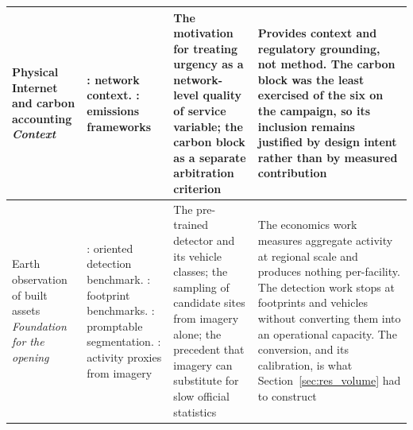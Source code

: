 \begin{longtable}{>{\raggedright\arraybackslash}p{2.6cm} >{\raggedright\arraybackslash}p{3.0cm} >{\raggedright\arraybackslash}p{3.4cm} >{\raggedright\arraybackslash}p{4.4cm}}
Physical Internet and carbon accounting \newline \textit{Context} &
\autocite{montreuil2011toward,guo2020dynamic,li2020exploring}: network context.
\autocite{smartfreight2023glec,commission2017vecto,ademe2014impacts,iso14083}: emissions
frameworks &
The motivation for treating urgency as a network-level quality of service variable; the
carbon block as a separate arbitration criterion &
Provides context and regulatory grounding, not method. The carbon block was the least
exercised of the six on the campaign, so its inclusion remains justified by design intent
rather than by measured contribution \\
\midrule

Earth observation of built assets \newline \textit{Foundation for the opening} &
\autocite{xia2018dota}: oriented detection benchmark.
\autocite{maggiori2017inria,vanetten2018spacenet}: footprint benchmarks.
\autocite{kirillov2023segment}: promptable segmentation.
\autocite{henderson2012measuring,jean2016combining}: activity proxies from imagery &
The pre-trained detector and its vehicle classes; the sampling of candidate sites from
imagery alone; the precedent that imagery can substitute for slow official statistics &
The economics work measures aggregate activity at regional scale and produces nothing
per-facility. The detection work stops at footprints and vehicles without converting them
into an operational capacity. The conversion, and its calibration, is what
Section~\ref{sec:res_volume} had to construct \\

\end{longtable}
